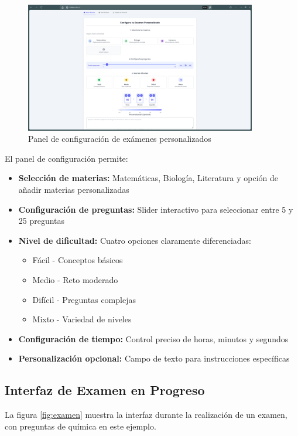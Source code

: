 \documentclass[12pt,a4paper]{report}
\begin{document}
\begin{figure}[h]
\centering
\includegraphics[width=0.9\textwidth]{assets/250617_06h45m25s_screenshot.png}
\caption{Panel de configuración de exámenes personalizados}
\label{fig:config}
\end{figure}

El panel de configuración permite:
\begin{itemize}
\item \textbf{Selección de materias:} Matemáticas, Biología, Literatura y opción de añadir materias personalizadas
\item \textbf{Configuración de preguntas:} Slider interactivo para seleccionar entre 5 y 25 preguntas
\item \textbf{Nivel de dificultad:} Cuatro opciones claramente diferenciadas:
  \begin{itemize}
  \item Fácil - Conceptos básicos
  \item Medio - Reto moderado  
  \item Difícil - Preguntas complejas
  \item Mixto - Variedad de niveles
  \end{itemize}
\item \textbf{Configuración de tiempo:} Control preciso de horas, minutos y segundos
\item \textbf{Personalización opcional:} Campo de texto para instrucciones específicas
\end{itemize}

\subsection{Interfaz de Examen en Progreso}

La figura \ref{fig:examen} muestra la interfaz durante la realización de un examen, con preguntas de química en este ejemplo.
\end{document}
